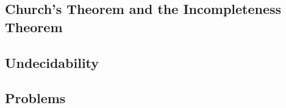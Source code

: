 
\subsection{Church's Theorem and the Incompleteness Theorem}


\subsection{Undecidability}


\subsection{Problems}

